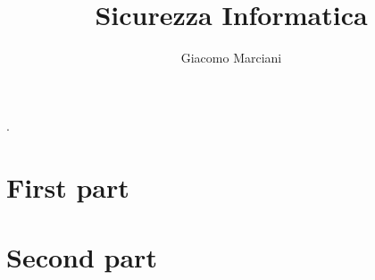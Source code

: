 \documentclass[12pt,a4paper,oneside,final]{amsbook}
\numberwithin{equation}{section}
\begin{document}
	.
\newtheorem{definition}{Definition}
\newtheorem{theorem}{Theorem}

\title{Sicurezza Informatica}

\author{Giacomo Marciani}

\address{University of Rome Tor Vergata}

\tableofcontents

\chapter{First part}


\chapter{Second part}


%


%
\end{document}
